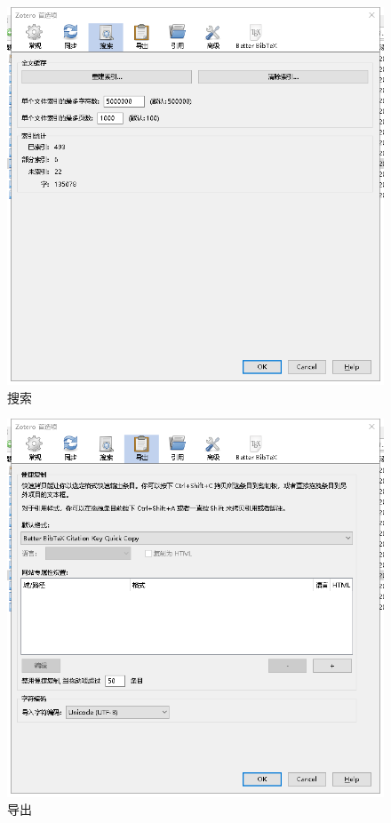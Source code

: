 \begin{figure}
	\centering
	\includegraphics[scale=0.8]{Fig/zotero4.png}
	\caption{\label{op4}搜索}
\end{figure}
\begin{figure}
	\centering
	\includegraphics[scale=0.8]{Fig/zotero5.png}
	\caption{\label{op5}导出}
\end{figure}
